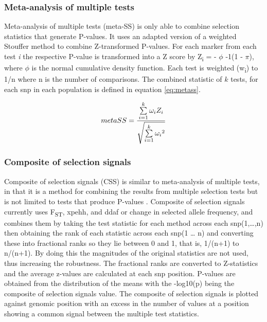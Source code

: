 \documentclass[twoside,openright]{report}
\begin{document}
\subsubsection{Meta-analysis of multiple
tests}\label{meta-analysis-of-multiple-tests}

Meta-analysis of multiple tests (meta-SS)
\citep{Utsunomiya2013, Utsunomiya2015} is only able to combine selection
statistics that generate P-values. It uses an adapted version of a
weighted Stouffer method \citep{stouffer1949american, Zaykin2011} to
combine Z-transformed P-values. For each marker from each test \emph{i}
the respective P-value is transformed into a Z score by
Z\textsubscript{i} = - \(\phi\) -1(1 - \(\pi\)), where \(\phi\) is the
normal cumulative density function. Each test is weighted
(w\textsubscript{i}) to 1/n where n is the number of comparisons. The
combined statistic of \(k\) tests, for each \gls{snp} in each population
is defined in equation \eqref{eq:metass}.

\begin{equation} 
meta\-SS = \frac{\sum\limits_{i =1}^k {\omega_i Z_i}}{\sqrt{\sum\limits_{i =1}^k {\omega_i}^2}}
\label{eq:metass}
\end{equation}

\subsubsection{Composite of selection
signals}\label{composite-of-selection-signals}

Composite of selection signals (CSS) is similar to meta-analysis of
multiple tests, in that it is a method for combining the results from
multiple selection tests but is not limited to tests that produce
P-values \citep{Randhawa2014}. Composite of selection signals currently
uses F\textsubscript{ST}, \gls{xpehh}, and \gls{ddaf} or change in
selected allele frequency, and combines them by taking the test
statistic for each method across each \gls{snp}(1,\ldots{},n) then
obtaining the rank of each statistic across each \gls{snp}(1 \ldots{} n)
and converting these into fractional ranks so they lie between 0 and 1,
that is, 1/(n+1) to n/(n+1). By doing this the magnitudes of the
original statistics are not used, thus increasing the robustness. The
fractional ranks are converted to Z-statistics and the average z-values
are calculated at each \gls{snp} position. P-values are obtained from
the distribution of the means with the -log10(p) being the composite of
selection signals value. The composite of selection signals is plotted
against genomic position with an excess in the number of values at a
position showing a common signal between the multiple test statistics.
\end{document}
